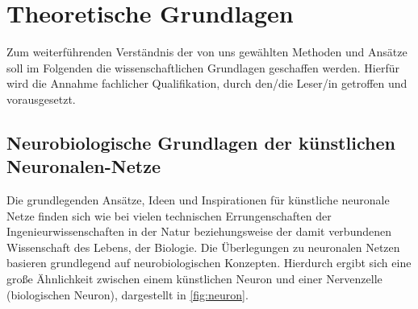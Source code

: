 \section{Theoretische Grundlagen}

Zum weiterführenden Verständnis der von uns gewählten Methoden und Ansätze soll im Folgenden die wissenschaftlichen Grundlagen geschaffen werden. Hierfür wird die Annahme fachlicher Qualifikation, durch den/die Leser/in getroffen und vorausgesetzt.

\subsection{Neurobiologische Grundlagen der künstlichen Neuronalen-Netze}
Die grundlegenden Ansätze, Ideen und Inspirationen für künstliche neuronale Netze finden sich wie bei vielen technischen Errungenschaften der Ingenieurwissenschaften in der Natur beziehungsweise der damit verbundenen Wissenschaft des Lebens, der Biologie.\newline
Die Überlegungen zu neuronalen Netzen basieren grundlegend auf neurobiologischen Konzepten. Hierdurch ergibt sich eine große Ähnlichkeit zwischen einem künstlichen Neuron und einer Nervenzelle (biologischen Neuron), dargestellt in  \ref{fig:neuron}.\newline

